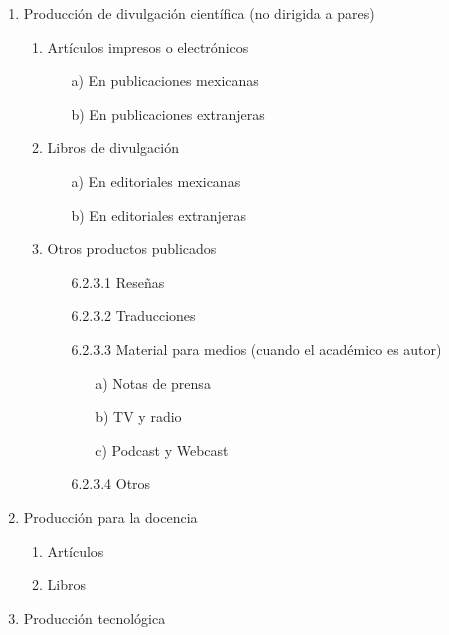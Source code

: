 \documentclass[12pt]{report}
\begin{document}
\begin{enumerate}
\begin{enumerate}
        	\item  Producción de divulgación científica (no dirigida a pares)

        			\begin{enumerate}
        			\item Artículos impresos o electrónicos
        					\begin{itemize}
        					\item[a)] En publicaciones mexicanas
        					\item[b)] En publicaciones extranjeras \\
        					\end{itemize}

        			\item Libros de divulgación
        					\begin{itemize}
        					\item[a)] En editoriales mexicanas
        					\item[b)] En editoriales extranjeras \\
        					\end{itemize}
        			\item Otros productos publicados
        					\begin{itemize}
        					\item[6.2.3.1] Reseñas
        					\item[6.2.3.2] Traducciones
        					\item[6.2.3.3] Material para medios (cuando el académico es autor)
        						\begin{itemize}
        						\item[a)] Notas de prensa
        						\item[b)] TV y radio
        						\item[c)] Podcast y Webcast
        						\end{itemize}
        					\item[6.2.3.4] Otros
        					\end{itemize}
        			\end{enumerate}
        	\item Producción para la docencia
        			\begin{enumerate}
        			\item Artículos
        			\item Libros \\
        			\end{enumerate}
        	\item Producción tecnológica
        	\end{enumerate}


\end{enumerate}
\end{document}
